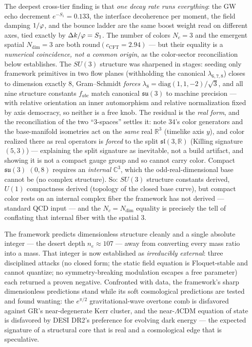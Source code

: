 \noindent The deepest cross-tier finding is that \emph{one decay rate runs everything}: the GW echo decrement $e^{-S_1}=0.133$, the interface decoherence per moment, the field damping $1/\varphi$, and the bounce ladder are the same boost weight read on different axes, tied exactly by $\Delta k/\varphi=S_1$. The number of colors $N_c=3$ and the emergent spatial $N_{\mathrm{dim}}=3$ are both $\mathrm{round}(c_{\mathrm{CFT}}=2.94)$ --- but their equality is a \emph{numerical coincidence, not a common origin}, as the color-sector reconciliation below establishes. The $SU(3)$ structure was sharpened in stages: seeding only framework primitives in two flow planes (withholding the canonical $\lambda_{6,7,8}$) closes to dimension exactly $8$, Gram--Schmidt \emph{forces} $\lambda_8=\mathrm{diag}(1,1,-2)/\sqrt3$, and all nine structure constants $f_{abc}$ match canonical $\mathfrak{su}(3)$ to machine precision --- with relative orientation an inner automorphism and relative normalization fixed by axis democracy, so neither is a free knob. The residual is the \emph{real form}, and the reconciliation of the two ``3-spaces'' settles it: note 34's color generators and the base-manifold isometries act on the \emph{same} real $\mathbb{R}^3$ (timelike axis $y$), and color realized there as real operators is \emph{forced} to the split $\mathfrak{sl}(3,\mathbb{R})$ (Killing signature $(5,3)$) --- explaining the split signature as inevitable, not a build artifact, and showing it is not a compact gauge group and so cannot carry color. Compact $\mathfrak{su}(3)$ $(0,8)$ requires an \emph{internal} $\mathbb{C}^3$, which the odd-real-dimensional base cannot be (no complex structure). So: $SU(3)$ structure constants derived, $U(1)$ compactness derived (topology of the closed base curve), but compact color rests on an internal complex fiber the framework has not derived --- standard QCD input --- and the $N_c=N_{\mathrm{dim}}$ equality is precisely the tell of conflating that internal fiber with the spatial $3$.

The framework predicts dimensionless structure cleanly and a single absolute integer --- the desert depth $n_e\approx107$ --- away from converting every mass ratio into a mass. That integer is now established as \emph{irreducibly external}: three disciplined attacks (no closed form; the static field equation is Floquet-stable and cannot quantize; no symmetry-breaking modulation escapes a free parameter) each returned a proven negative. Confronted with data, the framework's sharp dimensionless predictions stand while its soft cosmological predictions are tested and found wanting: the $e^{\pi/2}$ gravitational-wave overtone comb is disfavored against GR's near-degenerate Kerr cluster, and the near-$\Lambda$CDM equation of state is disfavored by DESI DR2's preference for evolving dark energy --- the expected signature of a structural core that is real and a cosmological edge that is speculative.

